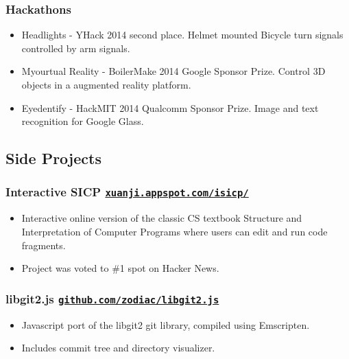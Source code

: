 \documentclass[letterpaper]{article}
\begin{document}
\subsubsection*{Hackathons}
\begin{itemize}
\setlength\itemsep{0em}
\item Headlights - YHack 2014 second place. Helmet mounted Bicycle turn signals controlled by arm signals.
\item Myourtual Reality - BoilerMake 2014 Google Sponsor Prize. Control 3D objects in a augmented reality platform.
\item Eyedentify - HackMIT 2014 Qualcomm Sponsor Prize. Image and text recognition for Google Glass.
\end{itemize}

\subsection*{Side Projects}

\subsubsection*{Interactive SICP \hfill \href{http://xuanji.appspot.com/isicp/}{\tt xuanji.appspot.com/isicp/}}
\begin{itemize}
\setlength\itemsep{0em}
\item Interactive online version of the classic CS textbook Structure and Interpretation of Computer Programs where users can edit and run code fragments.
\item Project was voted to \#1 spot on Hacker News.
\end{itemize}

\subsubsection*{libgit2.js \hfill \href{https://github.com/zodiac/libgit2.js}{\tt github.com/zodiac/libgit2.js}}
\begin{itemize}
\setlength\itemsep{0em}
\item Javascript port of the libgit2 git library, compiled using Emscripten.
\item Includes commit tree and directory visualizer.
\end{itemize}
\end{document}

